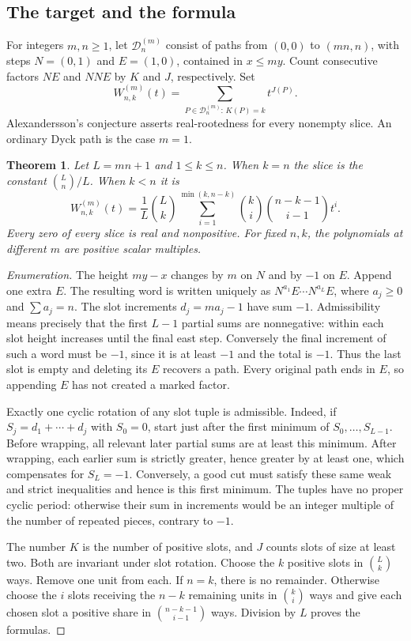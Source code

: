 \documentclass[11pt,a4paper]{article}
\newtheorem{SourceRcaRtheorem}{Theorem}
\begin{document}
\subsection{The target and the formula}
For integers $m,n\ge1$, let $\mathcal D_n^{(m)}$ consist of paths from
$(0,0)$ to $(mn,n)$, with steps $N=(0,1)$ and $E=(1,0)$, contained
in $x\le my$. Count consecutive factors $NE$ and $NNE$ by $K$ and
$J$, respectively. Set
\[
 W^{(m)}_{n,k}(t)=\sum_{P\in\mathcal D_n^{(m)}:\,K(P)=k}t^{J(P)} .
\]
Alexandersson's conjecture \cite{R20R:A} asserts real-rootedness for every
nonempty slice. An ordinary Dyck path is the case $m=1$.

\begin{SourceRcaRtheorem}
Let $L=mn+1$ and $1\le k\le n$. When $k=n$ the slice is the constant
$\binom{L}{n}/L$. When $k<n$ it is
\begin{equation}\label{R20R:eq:kernel}
 W^{(m)}_{n,k}(t)=\frac{1}{L}\binom{L}{k}
 \sum_{i=1}^{\min(k,n-k)}
 \binom{k}{i}\binom{n-k-1}{i-1}t^i.
\end{equation}
Every zero of every slice is real and nonpositive. For fixed $n,k$,
the polynomials at different $m$ are positive scalar multiples.
\end{SourceRcaRtheorem}

\begin{proof}[Enumeration]
The height $my-x$ changes by $m$ on $N$ and by $-1$ on $E$.
Append one extra $E$. The resulting word is written uniquely as
$N^{a_1}E\cdots N^{a_L}E$, where $a_j\ge0$ and $\sum a_j=n$.
The slot increments $d_j=ma_j-1$ have sum $-1$. Admissibility
means precisely that the first $L-1$ partial sums are nonnegative:
within each slot height increases until the final east step.
Conversely the final increment of such a word must be $-1$,
since it is at least $-1$ and the total is $-1$. Thus the last
slot is empty and deleting its $E$ recovers a path. Every original
path ends in $E$, so appending $E$ has not created a marked factor.

Exactly one cyclic rotation of any slot tuple is admissible.
Indeed, if $S_j=d_1+\cdots+d_j$ with $S_0=0$, start just after
the first minimum of $S_0,\ldots,S_{L-1}$. Before wrapping,
all relevant later partial sums are at least this minimum. After
wrapping, each earlier sum is strictly greater, hence greater by at
least one, which compensates for $S_L=-1$. Conversely, a good
cut must satisfy these same weak and strict inequalities and hence
is this first minimum. The tuples have no proper cyclic period:
otherwise their sum in increments would be an integer multiple
of the number of repeated pieces, contrary to $-1$.

The number $K$ is the number of positive slots, and $J$ counts
slots of size at least two. Both are invariant under slot rotation.
Choose the $k$ positive slots in $\binom{L}{k}$ ways. Remove one
unit from each. If $n=k$, there is no remainder. Otherwise choose
the $i$ slots receiving the $n-k$ remaining units in
$\binom{k}{i}$ ways and give each chosen slot a positive share in
$\binom{n-k-1}{i-1}$ ways. Division by $L$ proves the formulas.
\end{proof}
\end{document}

